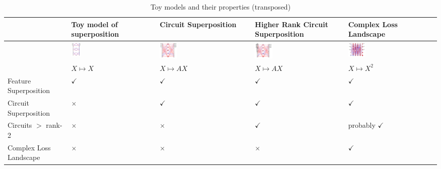 \documentclass{article}
\theoremstyle{plain}
\theoremstyle{definition}
\theoremstyle{remark}
\begin{document}
\begin{table}[htb]
    \centering
    \begin{tabularx}{\textwidth}{X X X X X}  %
        \toprule
         & Toy model of superposition & Circuit Superposition & Higher Rank Circuit Superposition & Complex Loss Landscape \\  
        \midrule

        \hline
        & \includegraphics[width=0.12\textwidth]{../figures/2a_toy_models_setup.pdf} &
        \includegraphics[width=0.2\textwidth]{../figures/2b_toy_models_setup.pdf} &
        \includegraphics[width=0.2\textwidth]{../figures/2c_toy_models_setup.pdf} &
        \includegraphics[width=0.2\textwidth]{../figures/2d_toy_models_setup.pdf} \\
         & $X \mapsto X$ & $X \mapsto A X$ & $X \mapsto A X$ & $X \mapsto X^2$ \\  
        Feature Superposition & $\checkmark$ & $\checkmark$ & $\checkmark$ & $\checkmark$ \\  
        Circuit Superposition & $\times$ & $\checkmark$ & $\checkmark$ & $\checkmark$ \\  
        Circuits $>$ rank-2 & $\times$ & $\times$ & $\checkmark$ & probably $\checkmark$ \\  
        Complex Loss Landscape & $\times$ & $\times$ & $\times$ & $\checkmark$ \\  
        \bottomrule
    \end{tabularx}
    \caption{Toy models and their properties (transposed)}
    \label{tab:toy_models}
\end{table}
\end{document}
